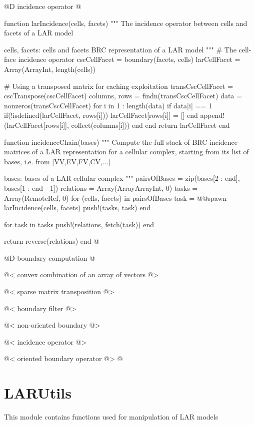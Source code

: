 \documentclass[11pt,oneside]{article}	%
\begin{document}
@D incidence operator
@{function larIncidence(cells, facets)
  """
  The incidence operator between cells
  and facets of a LAR model

  cells, facets: cells and facets BRC representation
  of a LAR model
  """
  # The cell-face incidence operator
  cscCellFacet = boundary(facets, cells)
  larCellFacet = Array(Array{Int}, length(cells))
  
  # Using a transposed matrix for caching exploitation
  transCscCellFacet = cscTranspose(cscCellFacet)
  columns, rows = findn(transCscCellFacet)
  data = nonzeros(transCscCellFacet)
  for i in 1 : length(data)
    if data[i] == 1
      if(!isdefined(larCellFacet, rows[i]))
        larCellFacet[rows[i]] = []
      end
      append!(larCellFacet[rows[i]], collect(columns[i]))
    end
  end
  return larCellFacet
end

function incidenceChain(bases)
  """
  Compute the full stack of BRC incidence matrices of
  a LAR representation for a cellular complex, starting
  from its list of bases, i.e. from [VV,EV,FV,CV,...]

  bases: bases of a LAR cellular complex
  """
  pairsOfBases = zip(bases[2 : end], bases[1 : end - 1])
  relations = Array(Array{Array{Int}}, 0)
  tasks = Array(RemoteRef, 0)
  for (cells, facets) in pairsOfBases
    task = @@spawn larIncidence(cells, facets)
    push!(tasks, task)
  end

  for task in tasks
    push!(relations, fetch(task))
  end

  return reverse(relations)
end @}

@D boundary computation
@{@< convex combination of an array of vectors @>

@< sparse matrix transposition @>

@< boundary filter @>

@< non-oriented boundary @>

@< incidence operator @>

@< oriented boundary operator @> @}

\section{LARUtils}\label{sec:LARUtils}

This module contains functions used for manipulation of LAR models
\end{document}
